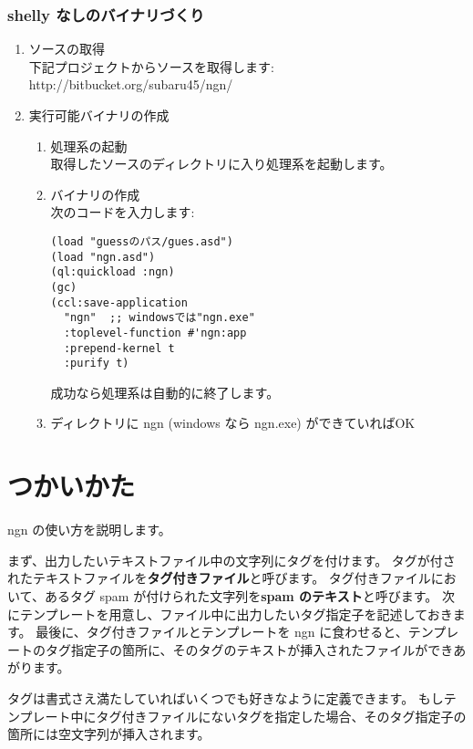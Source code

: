 \documentclass[a4j]{jsarticle}
\begin{document}
\subsubsection{shelly なしのバイナリづくり}
\begin{enumerate}
  \item ソースの取得 \\
    下記プロジェクトからソースを取得します: \\
    http://bitbucket.org/subaru45/ngn/ \\

  \item 実行可能バイナリの作成

  \begin{enumerate}
    \item 処理系の起動 \\
      取得したソースのディレクトリに入り処理系を起動します。

    \item バイナリの作成 \\
      次のコードを入力します:
      \begin{lstlisting}
(load "guessのパス/gues.asd")
(load "ngn.asd")
(ql:quickload :ngn)
(gc)
(ccl:save-application
  "ngn"  ;; windowsでは"ngn.exe"
  :toplevel-function #'ngn:app
  :prepend-kernel t
  :purify t)
      \end{lstlisting}
      
      成功なら処理系は自動的に終了します。

    \item ディレクトリに ngn (windows なら ngn.exe) ができていればOK

  \end{enumerate}
\end{enumerate}


\section{つかいかた}
ngn の使い方を説明します。

まず、出力したいテキストファイル中の文字列にタグを付けます。
タグが付されたテキストファイルを\textbf{タグ付きファイル}と呼びます。
タグ付きファイルにおいて、あるタグ spam が付けられた文字列を\textbf{spam のテキスト}と呼びます。
次にテンプレートを用意し、ファイル中に出力したいタグ指定子を記述しておきます。
最後に、タグ付きファイルとテンプレートを ngn に食わせると、テンプレートのタグ指定子の箇所に、そのタグのテキストが挿入されたファイルができあがります。

タグは書式さえ満たしていればいくつでも好きなように定義できます。
もしテンプレート中にタグ付きファイルにないタグを指定した場合、そのタグ指定子の箇所には空文字列が挿入されます。
\end{document}
